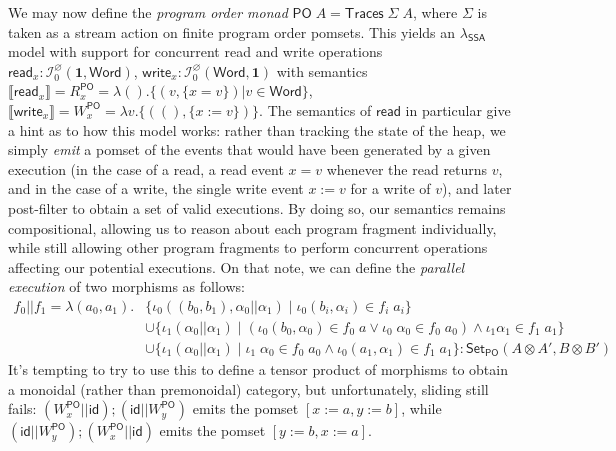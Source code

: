 \documentclass[acmsmall,screen,review]{acmart}
\newcommand{\mc}[1]{\ensuremath{\mathcal{#1}}}
\newcommand{\mb}[1]{\ensuremath{\mathbf{#1}}}
\newcommand{\ms}[1]{\ensuremath{\mathsf{#1}}}
\newcommand{\dnt}[1]{\llbracket{#1}\rrbracket}
\newcommand{\isotopessa}{\(\lambda_{\ms{SSA}}\)}
\begin{document}
We may now define the \emph{program order monad} \(\ms{PO}\;A = \ms{Traces}\;\Sigma\;A\), where
\(\Sigma\) is taken as a stream action on finite program order pomsets. This yields an \isotopessa{}
model with support for concurrent read and write operations \(\ms{read}_x:
\mc{I}^\varnothing_0(\mb{1}, \ms{Word})\), \(\ms{write}_x: \mc{I}^\varnothing_0(\ms{Word}, \mb{1})\)
with semantics
\(
  \dnt{\ms{read}_x} = R_x^{\ms{PO}} = \lambda (). \{(v, \{x = v\}) | v \in \ms{Word}\}
\),
\(
  \dnt{\ms{write}_x} = W_x^{\ms{PO}} =  \lambda v. \{((), \{x := v\})\}
\).
The semantics of \(\ms{read}\) in particular give a hint as to how this model works: rather than
tracking the state of the heap, we simply \textit{emit} a pomset of the events that would have been
generated by a given execution (in the case of a read, a read event \(x = v\) whenever the read
returns \(v\), and in the case of a write, the single write event \(x := v\) for a write of \(v\)),
and later post-filter to obtain a set of valid executions. By doing so, our semantics remains
compositional, allowing us to reason about each program fragment individually, while still allowing
other program fragments to perform concurrent operations affecting our potential executions. On that
note, we can define the \textit{parallel execution} of two morphisms as follows:
\begin{equation}
  \begin{aligned}
  f_0 || f_1 = \lambda (a_0, a_1). 
  & \{\iota_0 ((b_0, b_1), \alpha_0 || \alpha_1) 
    \mid \iota_0 (b_i, \alpha_i) \in f_i\;a_i\} 
  \\ & \cup \{\iota_1 (\alpha_0 || \alpha_1) 
      \mid (\iota_0 (b_0, \alpha_0) \in f_0\;a \lor \iota_0\;\alpha_0 \in f_0\;a_0) 
      \land \iota_1 \alpha_1 \in f_1\;a_1\} 
  \\ & \cup \{\iota_1 (\alpha_0 || \alpha_1) 
      \mid \iota_1\;\alpha_0 \in f_0\;a_0 
      \land \iota_0 (a_1, \alpha_1) \in f_1\;a_1\}
    : \ms{Set}_{\ms{PO}}(A \otimes A', B \otimes B')
  \end{aligned}
\end{equation}
It's tempting to try to use this to define a tensor product of morphisms to obtain a monoidal
(rather than premonoidal) category, but unfortunately, sliding still fails: \((W_x^{\ms{PO}} ||
\ms{id}) ; (\ms{id} || W_y^{\ms{PO}})\) emits the pomset \([x := a, y := b]\), while \((\ms{id} ||
W_y^{\ms{PO}}) ; (W_x^{\ms{PO}} || \ms{id})\) emits the pomset \([y := b, x := a]\). 
\end{document}
